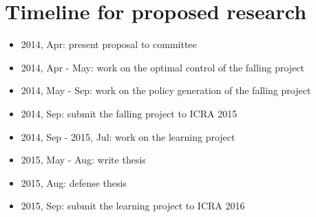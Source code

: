 \chapter{Timeline for proposed research}

\begin{itemize}
  \item 2014, Apr: present proposal to committee
  \item 2014, Apr - May: work on the optimal control of the falling project
  \item 2014, May - Sep: work on the policy generation of the falling project
  \item 2014, Sep: submit the falling project to ICRA 2015
  \item 2014, Sep - 2015, Jul: work on the learning project
  \item 2015, May - Aug: write thesis
  \item 2015, Aug: defense thesis
  \item 2015, Sep: submit the learning project to ICRA 2016
\end{itemize}
